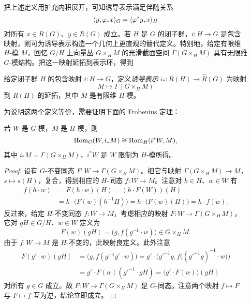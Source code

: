 
把上述定义用扩充内积展开，可知诱导表示满足伴随关系
\[
\langle y,\varphi_*x\rangle_G=\langle \varphi^*y,x\rangle_H
\]
对所有 $x\in R(G)$、$y\in R(G)$ 成立。若 $H$ 是 $G$ 的闭子群，$i:H\to G$ 是包含映射，则可为诱导表示构造一个几何上更直观的替代定义。特别地，给定有限维 $H$-模 $M$，回忆 $G/H$ 上向量丛 $G\times_H M$ 的光滑截面空间 $\Gamma(G\times_H M)$ 具有无限维 $G$-模结构。把这一映射延拓到表示环，得到

\begin{definition}
给定闭子群 $H$ 的包含映射 $i:H\to G$，定义\emph{诱导表示} $i_*:R(H)\to\widehat R(G)$ 为映射
\[
M\mapsto\Gamma(G\times_H M)
\]
到 $R(H)$ 的延拓，其中 $M$ 是有限维 $H$-模。
\end{definition}

为说明这两个定义等价，需要证明下面的 Frobenius 定理：

\begin{theorem}[Frobenius 互反]
若 $W$ 是 $G$-模，$M$ 是 $H$-模，则
\[
\operatorname{Hom}_G(W,i_*M)\cong\operatorname{Hom}_H(i^*W,M),
\]
其中 $i_*M=\Gamma(G\times_H M)$，$i^*W$ 是 $W$ 限制为 $H$-模所得。
\end{theorem}

\begin{proof}
设有 $G$-不变同态 $F:W\to\Gamma(G\times_H M)$。把它与映射 $\Gamma(G\times_H M)\to M$，$s\mapsto s(H)$，复合，得到相应的 $H$-同态 $f:W\to M$。注意对 $h\in H$、$w\in W$ 有
\[
\begin{aligned}
f(h\cdot w)&=F(h\cdot w)(H)=(h\cdot F(W))(H)\\
&=h\cdot\big(F(w)(h^{-1}H)\big)=h\cdot\big(F(w)(H)\big)=h\cdot f(w).
\end{aligned}
\]
反过来，给定 $H$-不变同态 $f:W\to M$，考虑相应的映射 $F:W\to\Gamma(G\times_H M)$，它对 $gH\in G/H$、$w\in W$ 定义为
\[
F(w)(gH)=\big(g,f(g^{-1}\cdot w)\big)\in G\times_H M.
\]
由于 $f:W\to M$ 是 $H$-不变的，此映射良定义。此外注意
\[
\begin{aligned}
F(g'\cdot w)(gH)&=\big(g,f(g^{-1}g'\cdot w)\big)
=g'\cdot\Big(g'^{-1}g,f\big((g'^{-1}g)^{-1}\cdot w\big)\Big)\\
&=g'\cdot F(w)(g'^{-1}\cdot gH)=\big(g'\cdot F(w)\big)(gH)
\end{aligned}
\]
对所有 $g\in G$ 成立。故 $F:W\to\Gamma(G\times_H M)$ 是 $G$-同态。注意两个映射 $f\mapsto F$ 与 $F\mapsto f$ 互为逆，结论立即成立。
\end{proof}

